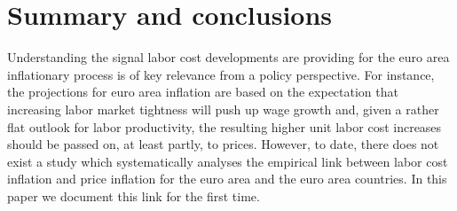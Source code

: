\documentclass[11pt]{article}
\begin{document}




\section{Summary and conclusions}
Understanding the signal labor cost developments are  providing for the euro area inflationary process is of key relevance from a policy perspective. For instance, the projections for euro area inflation are based on the expectation that increasing labor market tightness will push up wage growth and, given a rather flat outlook for labor productivity, the resulting higher unit labor cost increases should be passed on, at least partly, to prices. However, to date, there does not exist a study which systematically analyses the empirical link between labor cost inflation and price inflation for the euro area and the euro area countries. In this paper we document this link for the first time. 
\end{document}
